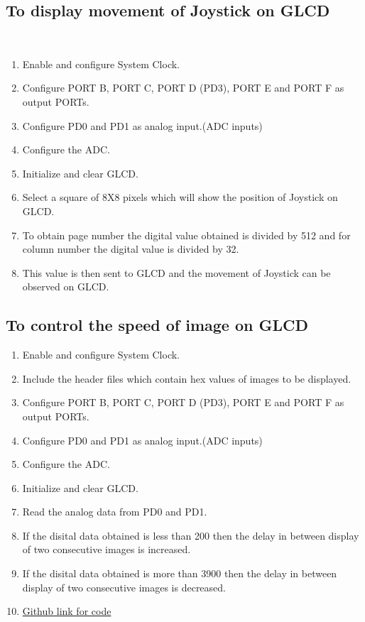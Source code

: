 \documentclass[a4paper,12pt,oneside]{book}
\begin{document}
\subsection{To display movement of Joystick on GLCD}\
\begin{enumerate}
\item Enable and configure System Clock.
\item Configure PORT B, PORT C, PORT D (PD3), PORT E and PORT F as output PORTs.
\item Configure PD0 and PD1 as analog input.(ADC inputs)
\item Configure the ADC.
\item Initialize and clear GLCD.
\item Select a square of 8X8 pixels which will show the position of Joystick on GLCD.
\item To obtain page number the digital value obtained is divided by 512 and for column number the digital value is divided by 32.
\item This value is then sent to GLCD and the movement of Joystick can be observed on GLCD.

\end{enumerate}

\subsection{To control the speed of image on GLCD}
\begin{enumerate}
\item Enable and configure System Clock.
\item Include the header files which contain hex values of images to be displayed.
\item Configure PORT B, PORT C, PORT D (PD3), PORT E and PORT F as output PORTs.
\item Configure PD0 and PD1 as analog input.(ADC inputs)
\item Configure the ADC.
\item Initialize and clear GLCD.
\item Read the analog data from PD0 and PD1. 
\item If the disital data obtained is less than 200 then the delay in between display of two consecutive images is increased.
\item If the disital data obtained is more than 3900 then the delay in between display of two consecutive images is decreased.
\item \href{https://github.com/eYSIP-2016/eYSIP-2016-Around-the-world-of-Embedded-Systems/tree/origin/master/Solutions/development\%20board/controlling\_moving\_images\_on\_glcd}{Github link for code}
\end{enumerate}
\end{document}
